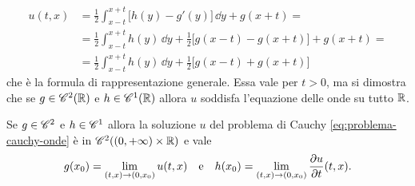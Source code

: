 \begin{equation}
    \begin{split}
        u(t,x)&=
        \frac12\int_{x-t}^{x+t}\bigl[h(y)-g'(y)\bigr]\,\dd y+g(x+t)=\\ &=
        \frac12\int_{x-t}^{x+t}h(y)\,\dd y+\frac12\bigl[g(x-t)-g(x+t)\bigr]+g(x+t)=\\ &=
        \frac12\int_{x-t}^{x+t}h(y)\,\dd y+\frac12\bigl[g(x-t)+g(x+t)\bigr]
    \end{split}
    \label{eq:rappresentazione-soluzione-onde}
\end{equation}
che è la formula di rappresentazione generale.
Essa vale per $t>0$, ma si dimostra che se $g\in\cont[2]{\R}$ e $h\in\cont[1]{\R}$ allora $u$ soddisfa l'equazione delle onde su tutto $\R$.
\begin{teorema}
    Se $g\in\cclass[2]$ e $h\in\cclass[1]$ allora la soluzione $u$ del problema di Cauchy \eqref{eq:problema-cauchy-onde} è in $\cont[2]{(0,+\infty)\times\R}$ e vale
    \begin{equation}
        g(x_0)=\lim_{(t,x)\to(0,x_0)}u(t,x)
        \qtext{e}
        h(x_0)=\lim_{(t,x)\to(0,x_0)}\drp{u}{t}(t,x).
    \end{equation}
\end{teorema}

